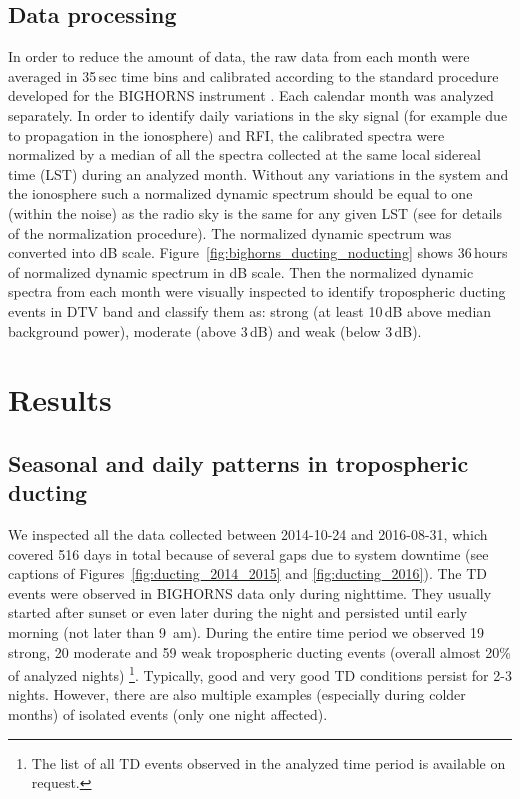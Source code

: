 \documentclass{article}
\begin{document}
\subsection{Data processing}
\label{subsec:data_proc}

In order to reduce the amount of data, the raw data from each month were averaged in 35\,sec time bins and calibrated according to the standard procedure developed for the BIGHORNS instrument \cite{2015PASA...32....4S,2015ApJ...813...18S}. 
Each calendar month was analyzed separately. In order to identify daily variations in the sky signal (for example due to propagation in the ionosphere) and RFI, the calibrated spectra were normalized by a median of all the spectra collected at the same local sidereal time (LST) during an analyzed month. 
Without any variations in the system and the ionosphere such a normalized dynamic spectrum should be equal to one (within the noise) as the radio sky is the same for any given LST (see \citep{2015ApJ...813...18S} for details of the normalization procedure). 
The normalized dynamic spectrum was converted into dB scale. Figure~\ref{fig:bighorns_ducting_noducting} shows 36\,hours of normalized dynamic spectrum in dB scale. Then the normalized dynamic spectra from each month were visually inspected to identify tropospheric ducting events in DTV band and classify them as: strong (at least 10\,dB above median background power), moderate (above 3\,dB) and weak (below 3\,dB).

\section{Results}
\label{sec:results}

\subsection{Seasonal and daily patterns in tropospheric ducting}
\label{subsec:seasonal_daily_patterns}

We inspected all the data collected between 2014-10-24 and 2016-08-31, which covered 516 days in total because of several gaps due to system downtime (see captions of Figures~\ref{fig:ducting_2014_2015} and \ref{fig:ducting_2016}). 
The TD events were observed in BIGHORNS data only during nighttime. They usually started after sunset or even later during the night and persisted until early morning (not later than 9~am).
During the entire time period we observed 19 strong, 20 moderate and 59 weak tropospheric ducting events (overall almost 20\% of analyzed nights) \footnote{The list of all TD events observed in the analyzed time period is available on request.}.
Typically, good and very good TD conditions persist for 2-3 nights. However, there are also multiple examples (especially during colder months) of isolated events (only one night affected).
\end{document}
